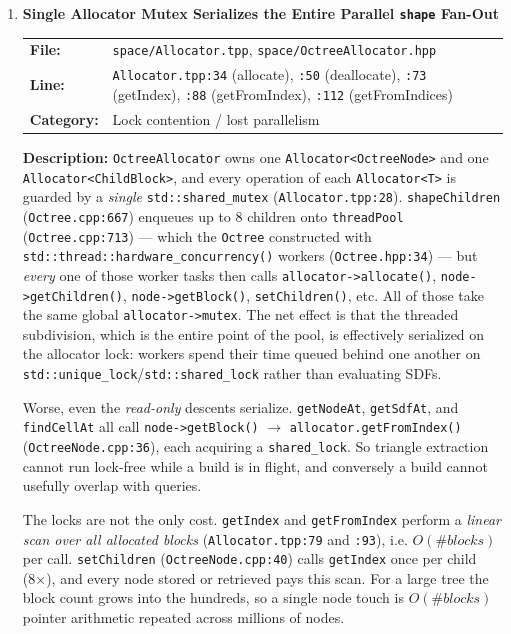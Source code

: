\documentclass[a4paper,12pt]{article}
\newcommand{\severitybox}[2]{%
  \colorbox{#1}{\makebox[2.5cm][c]{\textcolor{white}{\textbf{#2}}}}%
}
\begin{document}
\begin{enumerate}[leftmargin=*]

\item[\textbf{[O1]}] \textbf{Single Allocator Mutex Serializes the Entire Parallel \texttt{shape} Fan-Out}
  \hfill \severitybox{highcolor}{HIGH}

  \begin{tabular}{ll}
    \textbf{File:} & \texttt{space/Allocator.tpp}, \texttt{space/OctreeAllocator.hpp} \\
    \textbf{Line:} & \texttt{Allocator.tpp:34} (allocate), \texttt{:50} (deallocate),
                      \texttt{:73} (getIndex), \texttt{:88} (getFromIndex),
                      \texttt{:112} (getFromIndices) \\
    \textbf{Category:} & Lock contention / lost parallelism \\
  \end{tabular}

  \textbf{Description:}
  \texttt{OctreeAllocator} owns one \texttt{Allocator<OctreeNode>} and one
  \texttt{Allocator<ChildBlock>}, and every operation of each
  \texttt{Allocator<T>} is guarded by a \emph{single} \texttt{std::shared\_mutex}
  (\texttt{Allocator.tpp:28}). \texttt{shapeChildren}
  (\texttt{Octree.cpp:667}) enqueues up to 8 children onto
  \texttt{threadPool} (\texttt{Octree.cpp:713}) — which the \texttt{Octree}
  constructed with \texttt{std::thread::hardware\_concurrency()} workers
  (\texttt{Octree.hpp:34}) — but \emph{every} one of those worker tasks then calls
  \texttt{allocator->allocate()}, \texttt{node->getChildren()},
  \texttt{node->getBlock()}, \texttt{setChildren()}, etc. All of those take the
  same global \texttt{allocator->mutex}. The net effect is that the threaded
  subdivision, which is the entire point of the pool, is effectively serialized on
  the allocator lock: workers spend their time queued behind one another on
  \texttt{std::unique\_lock}/\texttt{std::shared\_lock} rather than evaluating SDFs.

  Worse, even the \emph{read-only} descents serialize. \texttt{getNodeAt},
  \texttt{getSdfAt}, and \texttt{findCellAt} all call
  \texttt{node->getBlock()} $\rightarrow$ \texttt{allocator.getFromIndex()}
  (\texttt{OctreeNode.cpp:36}), each acquiring a \texttt{shared\_lock}. So triangle
  extraction cannot run lock-free while a build is in flight, and conversely a
  build cannot usefully overlap with queries.

  The locks are not the only cost. \texttt{getIndex} and \texttt{getFromIndex}
  perform a \emph{linear scan over all allocated blocks}
  (\texttt{Allocator.tpp:79} and \texttt{:93}), i.e. $O(\#blocks)$ per call.
  \texttt{setChildren} (\texttt{OctreeNode.cpp:40}) calls \texttt{getIndex} once
  per child (8×), and every node stored or retrieved pays this scan. For a large
  tree the block count grows into the hundreds, so a single node touch is
  $O(\#blocks)$ pointer arithmetic repeated across millions of nodes.


\end{enumerate}
\end{document}
